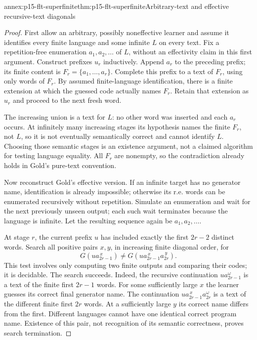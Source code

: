 \begin{annexitem}{annex:p15-flt-superfinite}{thm:p15-flt-superfinite}{Arbitrary-text and effective recursive-text diagonals}
\begin{proof}
First allow an arbitrary, possibly noneffective learner
and assume it identifies every finite language and some
infinite \(L\) on every text.
Fix a repetition-free enumeration \(a_1,a_2,\ldots\) of
\(L\), without an effectivity claim in this first argument.
Construct prefixes \(u_r\) inductively.
Append \(a_r\) to the preceding prefix; its finite content
is \(F_r=\{a_1,\ldots,a_r\}\).
Complete this prefix to a text of \(F_r\), using only
words of \(F_r\). By assumed finite-language identification,
there is a finite extension at which the guessed code
actually names \(F_r\). Retain that extension as \(u_r\)
and proceed to the next fresh word.

The increasing union is a text for \(L\): no other word
was inserted and each \(a_r\) occurs.
At infinitely many increasing stages its hypothesis names
the finite \(F_r\), not \(L\), so it is not eventually
semantically correct and cannot identify \(L\).
Choosing those semantic stages is an existence argument,
not a claimed algorithm for testing language equality.
All \(F_r\) are nonempty, so the contradiction already
holds in Gold's pure-text convention.

Now reconstruct Gold's effective version. If an infinite
target has no generator name, identification is already
impossible; otherwise its r.e. words can be enumerated
recursively without repetition. Simulate an enumeration
and wait for the next previously unseen output; each
such wait terminates because the language is infinite.
Let the resulting sequence again be \(a_1,a_2,\ldots\).

At stage \(r\), the current prefix \(u\) has included
exactly the first \(2r-2\) distinct words.
Search all positive pairs \(x,y\), in increasing finite
diagonal order, for
\[
 G(u a_{2r-1}^{\,x})
 \ne G(u a_{2r-1}^{\,x}a_{2r}^{\,y}).
\]
This test involves only computing two finite outputs and
comparing their codes; it is decidable.
The search succeeds. Indeed, the recursive continuation
\(u a_{2r-1}^{\omega}\) is a text of the finite
first \(2r-1\) words. For some sufficiently large \(x\)
the learner guesses its correct final generator name.
The continuation
\(u a_{2r-1}^{\,x}a_{2r}^{\omega}\) is a text of the
different finite first \(2r\) words. At a sufficiently
large \(y\) its correct name differs from the first.
Different languages cannot have one identical correct
program name. Existence of this pair, not recognition
of its semantic correctness, proves search termination.


\end{proof}
\end{annexitem}
